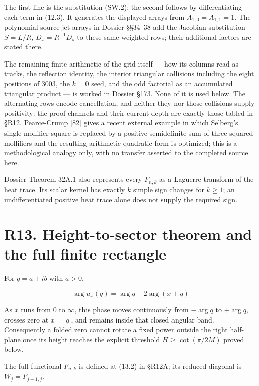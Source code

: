 \documentclass[
  11pt,
]{book}
\begin{document}
The first line is the substitution (SW.2); the second follows by
differentiating each term in (12.3). It generates the displayed arrays
from \(A_{1,0}=A_{1,1}=1\). The polynomial source-jet arrays in Dossier
§§34--38 add the Jacobian substitution \(S=L/R\), \(D_x=R^{-1}D_s\) to
these same weighted rows; their additional factors are stated there.

The remaining finite arithmetic of the grid itself --- how its columns
read as tracks, the reflection identity, the interior triangular
collisions including the eight positions of \(3003\), the \(k=0\) seed,
and the odd factorial as an accumulated triangular product --- is worked
in Dossier §173. None of it is used below. The alternating rows encode
cancellation, and neither they nor those collisions supply positivity:
the proof channels and their current depth are exactly those tabled in
§R12. Pearce-Crump {[}82{]} gives a recent external example in which
Selberg's single mollifier square is replaced by a positive-semidefinite
sum of three squared mollifiers and the resulting arithmetic quadratic
form is optimized; this is a methodological analogy only, with no
transfer asserted to the completed source here.

Dossier Theorem 32A.1 also represents every \(F_{n,k}\) as a Laguerre
transform of the heat trace. Its scalar kernel has exactly \(k\) simple
sign changes for \(k\ge1\); an undifferentiated positive heat trace
alone does not supply the required sign.

\section{R13. Height-to-sector theorem and the full finite
rectangle}\label{r13.-height-to-sector-theorem-and-the-full-finite-rectangle}

For \(q=a+ib\) with \(a>0\),

\[
\arg u_x(q)=\arg q-2\arg(x+q)
\tag{13.1}
\]

As \(x\) runs from \(0\) to \(\infty\), this phase moves continuously
from \(-\arg q\) to \(+\arg q\), crosses zero at \(x=|q|\), and remains
inside that closed angular band. Consequently a folded zero cannot
rotate a fixed power outside the right half-plane once its height
reaches the explicit threshold \(H\ge\cot(\pi/2M)\) proved below.

The full functional \(F_{n,k}\) is defined at (13.2) in §R12A; its
reduced diagonal is \(W_j=F_{j-1,j}\).

\end{document}
